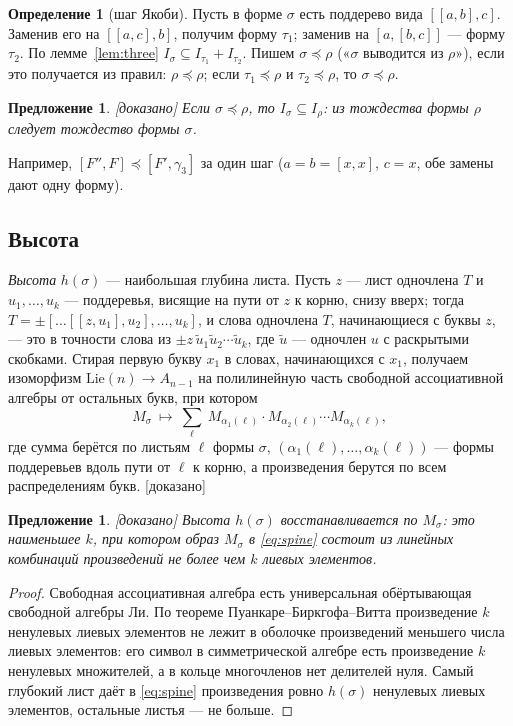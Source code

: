 \documentclass[11pt]{article}
\newcommand{\Lie}{\mathrm{Lie}}
\newcommand{\g}{\gamma}
\newcommand{\stat}[1]{\textsf{\small[#1]}}
\newcommand{\proved}{\stat{доказано}}
\theoremstyle{plain}
\newtheorem{proposition}[theorem]{Предложение}
\theoremstyle{definition}
\newtheorem{definition}[theorem]{Определение}
\theoremstyle{remark}
\begin{document}
\begin{definition}[шаг Якоби]
Пусть в форме $\sigma$ есть поддерево вида $[[a,b],c]$. Заменив его на $[[a,c],b]$, получим форму $\tau_1$; заменив на $[a,[b,c]]$ --- форму $\tau_2$. По лемме~\ref{lem:three} $I_\sigma\subseteq I_{\tau_1}+I_{\tau_2}$. Пишем $\sigma\preceq\rho$ («$\sigma$ выводится из $\rho$»), если это получается из правил: $\rho\preceq\rho$; если $\tau_1\preceq\rho$ и $\tau_2\preceq\rho$, то $\sigma\preceq\rho$.
\end{definition}

\begin{proposition}\label{prop:sound} \proved{}
Если $\sigma\preceq\rho$, то $I_\sigma\subseteq I_\rho$: из тождества формы $\rho$ следует тождество формы $\sigma$.
\end{proposition}

Например, $[F'',F]\preceq[F',\g_3]$ за один шаг ($a=b=[x,x]$, $c=x$, обе замены дают одну форму).

\subsection{Высота}

\emph{Высота} $h(\sigma)$ --- наибольшая глубина листа. Пусть $z$ --- лист одночлена $T$ и $u_1,\dots,u_k$ --- поддеревья, висящие на пути от $z$ к корню, снизу вверх; тогда $T=\pm[\dots[[z,u_1],u_2],\dots,u_k]$, и слова одночлена $T$, начинающиеся с буквы $z$, --- это в точности слова из $\pm z\,\widetilde u_1\widetilde u_2\cdots\widetilde u_k$, где $\widetilde u$ --- одночлен $u$ с раскрытыми скобками. Стирая первую букву $x_1$ в словах, начинающихся с $x_1$, получаем изоморфизм $\Lie(n)\to A_{n-1}$ на полилинейную часть свободной ассоциативной алгебры от остальных букв, при котором
\begin{equation}\label{eq:spine}
M_\sigma\ \longmapsto\ \sum_{\ell}\ M_{\alpha_1(\ell)}\cdot M_{\alpha_2(\ell)}\cdots M_{\alpha_{k}(\ell)},
\end{equation}
где сумма берётся по листьям $\ell$ формы $\sigma$, $(\alpha_1(\ell),\dots,\alpha_k(\ell))$ --- формы поддеревьев вдоль пути от $\ell$ к корню, а произведения берутся по всем распределениям букв. \proved

\begin{proposition} \proved{}
Высота $h(\sigma)$ восстанавливается по $M_\sigma$: это наименьшее $k$, при котором образ $M_\sigma$ в \eqref{eq:spine} состоит из линейных комбинаций произведений не более чем $k$ лиевых элементов.
\end{proposition}
\begin{proof}
Свободная ассоциативная алгебра есть универсальная обёртывающая свободной алгебры Ли. По теореме Пуанкаре--Биркгофа--Витта произведение $k$ ненулевых лиевых элементов не лежит в оболочке произведений меньшего числа лиевых элементов: его символ в симметрической алгебре есть произведение $k$ ненулевых множителей, а в кольце многочленов нет делителей нуля. Самый глубокий лист даёт в \eqref{eq:spine} произведения ровно $h(\sigma)$ ненулевых лиевых элементов, остальные листья --- не больше.
\end{proof}
\end{document}
